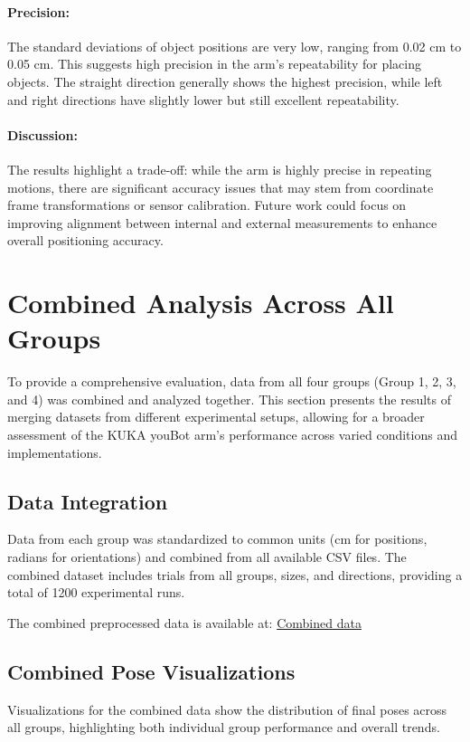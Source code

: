 \paragraph{Precision:}
The standard deviations of object positions are very low, ranging from 0.02 cm to 0.05 cm. This suggests high precision in the arm's repeatability for placing objects. The straight direction generally shows the highest precision, while left and right directions have slightly lower but still excellent repeatability.

\paragraph{Discussion:}
The results highlight a trade-off: while the arm is highly precise in repeating motions, there are significant accuracy issues that may stem from coordinate frame transformations or sensor calibration. Future work could focus on improving alignment between internal and external measurements to enhance overall positioning accuracy.



\section{Combined Analysis Across All Groups}
To provide a comprehensive evaluation, data from all four groups (Group 1, 2, 3, and 4) was combined and analyzed together. This section presents the results of merging datasets from different experimental setups, allowing for a broader assessment of the KUKA youBot arm's performance across varied conditions and implementations.

\subsection{Data Integration}
Data from each group was standardized to common units (cm for positions, radians for orientations) and combined from all available CSV files. The combined dataset includes trials from all groups, sizes, and directions, providing a total of 1200 experimental runs.

The combined preprocessed data is available at:
\href{https://github.com/Nikhil-URG/KUKA-Youbot-RobotArm_Manipulation/blob/main/combined_preprocessed_data.csv}{Combined data}

\subsection{Combined Pose Visualizations}
Visualizations for the combined data show the distribution of final poses across all groups, highlighting both individual group performance and overall trends.

